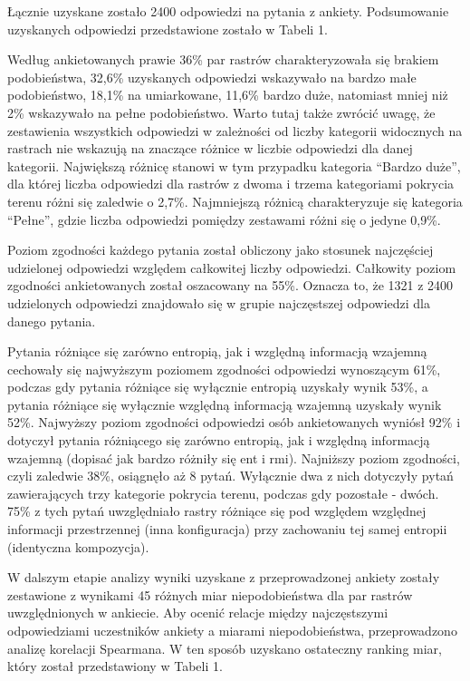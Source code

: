 \documentclass{amuthesis}
\begin{document}
Łącznie uzyskane zostało 2400 odpowiedzi na pytania z ankiety.
Podsumowanie uzyskanych odpowiedzi przedstawione zostało w Tabeli 1.

Według ankietowanych prawie 36\% par rastrów charakteryzowała się
brakiem podobieństwa, 32,6\% uzyskanych odpowiedzi wskazywało na bardzo
małe podobieństwo, 18,1\% na umiarkowane, 11,6\% bardzo duże, natomiast
mniej niż 2\% wskazywało na pełne podobieństwo. Warto tutaj także
zwrócić uwagę, że zestawienia wszystkich odpowiedzi w zależności od
liczby kategorii widocznych na rastrach nie wskazują na znaczące różnice
w liczbie odpowiedzi dla danej kategorii. Największą różnicę stanowi w
tym przypadku kategoria ``Bardzo duże'', dla której liczba odpowiedzi
dla rastrów z dwoma i trzema kategoriami pokrycia terenu różni się
zaledwie o 2,7\%. Najmniejszą różnicą charakteryzuje się kategoria
``Pełne'', gdzie liczba odpowiedzi pomiędzy zestawami różni się o jedyne
0,9\%.

Poziom zgodności każdego pytania został obliczony jako stosunek
najczęściej udzielonej odpowiedzi względem całkowitej liczby odpowiedzi.
Całkowity poziom zgodności ankietowanych został oszacowany na 55\%.
Oznacza to, że 1321 z 2400 udzielonych odpowiedzi znajdowało się w
grupie najczęstszej odpowiedzi dla danego pytania.

Pytania różniące się zarówno entropią, jak i względną informacją
wzajemną cechowały się najwyższym poziomem zgodności odpowiedzi
wynoszącym 61\%, podczas gdy pytania różniące się wyłącznie entropią
uzyskały wynik 53\%, a pytania różniące się wyłącznie względną
informacją wzajemną uzyskały wynik 52\%. Najwyższy poziom zgodności
odpowiedzi osób ankietowanych wyniósł 92\% i dotyczył pytania różniącego
się zarówno entropią, jak i względną informacją wzajemną (dopisać jak
bardzo różniły się ent i rmi). Najniższy poziom zgodności, czyli
zaledwie 38\%, osiągnęło aż 8 pytań. Wyłącznie dwa z nich dotyczyły
pytań zawierających trzy kategorie pokrycia terenu, podczas gdy
pozostałe - dwóch. 75\% z tych pytań uwzględniało rastry różniące się
pod względem względnej informacji przestrzennej (inna konfiguracja) przy
zachowaniu tej samej entropii (identyczna kompozycja).

W dalszym etapie analizy wyniki uzyskane z przeprowadzonej ankiety
zostały zestawione z wynikami 45 różnych miar niepodobieństwa dla par
rastrów uwzględnionych w ankiecie. Aby ocenić relacje między
najczęstszymi odpowiedziami uczestników ankiety a miarami
niepodobieństwa, przeprowadzono analizę korelacji Spearmana. W ten
sposób uzyskano ostateczny ranking miar, który został przedstawiony w
Tabeli 1.
\end{document}

